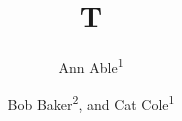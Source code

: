 \documentclass{article}
\newcommand{\lastand}{, and }
\begin{document}
\title{T}
\author{Ann Able\textsuperscript{1}\and Bob Baker\textsuperscript{2}\lastand Cat Cole\textsuperscript{1}}
\maketitle
\end{document}
